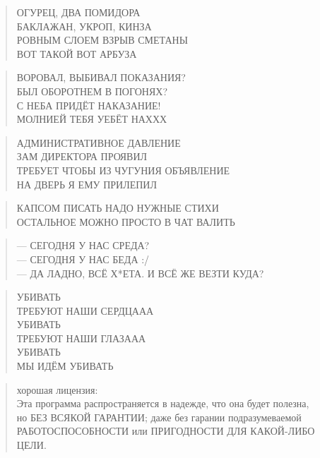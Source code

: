 \poemtitle{***}
\begin{verse}
ОГУРЕЦ, ДВА ПОМИДОРА\\
БАКЛАЖАН, УКРОП, КИНЗА\\
РОВНЫМ СЛОЕМ ВЗРЫВ СМЕТАНЫ\\
ВОТ ТАКОЙ ВОТ АРБУЗА
\end{verse}

\poemtitle{***}
\begin{verse}
ВОРОВАЛ, ВЫБИВАЛ ПОКАЗАНИЯ?\\
БЫЛ ОБОРОТНЕМ В ПОГОНЯХ?\\
С НЕБА ПРИДЁТ НАКАЗАНИЕ!\\
МОЛНИЕЙ ТЕБЯ УЕБЁТ НАХХХ
\end{verse}

\poemtitle{***}
\begin{verse}
АДМИНИСТРАТИВНОЕ ДАВЛЕНИЕ\\
ЗАМ ДИРЕКТОРА ПРОЯВИЛ\\
ТРЕБУЕТ ЧТОБЫ ИЗ ЧУГУНИЯ ОБЪЯВЛЕНИЕ\\
НА ДВЕРЬ Я ЕМУ ПРИЛЕПИЛ
\end{verse}

\poemtitle{***}
\begin{verse}
КАПСОМ ПИСАТЬ НАДО НУЖНЫЕ СТИХИ\\
ОСТАЛЬНОЕ МОЖНО ПРОСТО В ЧАТ ВАЛИТЬ
\end{verse}

\poemtitle{***}
\begin{verse}
— СЕГОДНЯ У НАС СРЕДА?\\
— СЕГОДНЯ У НАС БЕДА :/\\
— ДА ЛАДНО, ВСЁ Х*ЕТА. И ВСЁ ЖЕ ВЕЗТИ КУДА?
\end{verse}

\poemtitle{***}
\begin{verse}
УБИВАТЬ\\
ТРЕБУЮТ НАШИ СЕРДЦААА\\
УБИВАТЬ\\
ТРЕБУЮТ НАШИ ГЛАЗААА\\
УБИВАТЬ\\
МЫ ИДЁМ УБИВАТЬ
\end{verse}

\poemtitle{***}
\begin{verse}
хорошая лицензия:\\
Эта программа распространяется в надежде, что она будет полезна,\\
но БЕЗ ВСЯКОЙ ГАРАНТИИ; даже без гарании подразумеваемой\\
РАБОТОСПОСОБНОСТИ или ПРИГОДНОСТИ ДЛЯ КАКОЙ-ЛИБО ЦЕЛИ.
\end{verse}


